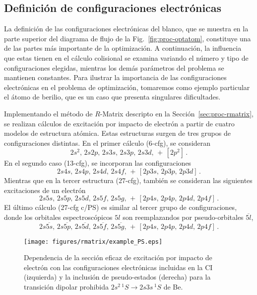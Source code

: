 \subsection{Definición de configuraciones electrónicas}

La definición de las configuraciones electrónicas del blanco, que se 
muestra en la parte superior del diagrama de flujo de la 
Fig.~\ref{fig:proc-optatom}, constituye una de las partes más importante 
de la optimización. A continuación, la influencia que estas tienen en el 
cálculo colisional se examina variando el número y tipo de 
configuraciones elegidas, mientras los demás parámetros del problema se 
mantienen constantes. Para ilustrar la importancia de las 
configuraciones electrónicas en el problema de optimización, tomaremos 
como ejemplo particular el átomo de berilio, que es un caso que presenta 
singulares dificultades. 

Implementando el método de $R$-Matrix descripto en la 
Sección~\ref{sec:proc-rmatrix}, se realizan cálculos de excitación por 
impacto de electrón a partir de cuatro modelos de estructura atómica. 
Estas estructuras surgen de tres grupos de configuraciones distintas. En 
el primer cálculo (6-cfg), se consideran  
\begin{equation}
2s^2,\,2s2p,\,2s3s,\,2s3p,\,2s3d,\,+\,
\left[2p^2\right]\,.
\label{eq:cfgA}
\end{equation} 
En el segundo caso (13-cfg), se incorporan las configuraciones 
\begin{equation}
2s4s,\,2s4p,\,2s4d,\,2s4f,\,+\,
\left[2p3s,\,2p3p,\,2p3d\right]\,.
\label{eq:cfgB}
\end{equation} 
Mientras que en la tercer estructura (27-cfg), también se consideran las 
siguientes excitaciones de un electrón 
\begin{equation}
2s5s,\,2s5p,\,2s5d,\,2s5f,\,2s5g,\,+\,
\left[2p4s,\,2p4p,\,2p4d,\,2p4f\right]\,.
\label{eq:cfgC}
\end{equation} 
El último cálculo (27-cfg c/PS) es similar al tercer grupo de 
configuraciones, donde los orbitales espectroscópicos $5l$ son 
reemplazandos por pseudo-orbitales $\overline{5l}$,
\begin{equation}
2s\overline{5s},\,2s\overline{5p},\,2s\overline{5d},\,2s\overline{5f},\,
2s\overline{5g},\,+\,
\left[2p4s,\,2p4p,\,2p4d,\,2p4f\right]\,.
\label{eq:cfgD}
\end{equation} 

\begin{figure}[t]
\centering
\texttt{[image: figures/rmatrix/example\_PS.eps]}
\caption[Dependencia de la sección eficaz de excitación con las 
configuraciones electrónicas y los pseudo-estados.]
{Dependencia de la sección eficaz de excitación por impacto de
electrón con las configuraciones electrónicas incluidas en la CI 
(izquierda) y la inclusión de pseudo-estados (derecha) para la transición 
dipolar prohibida $2s^2\,^1S \rightarrow 2s3s\,^1S$ de Be.}
\label{fig:dependencia-CI}
\end{figure}

